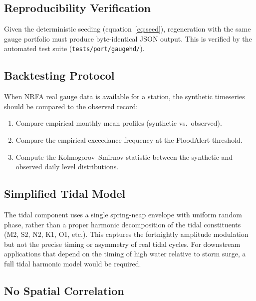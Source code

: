\documentclass[11pt,a4paper]{article}
\begin{document}
\subsection{Reproducibility Verification}

Given the deterministic seeding (equation~\ref{eq:seed}), regeneration with the same
gauge portfolio must produce byte-identical JSON output. This is verified by the
automated test suite (\texttt{tests/port/gaugehd/}).

\subsection{Backtesting Protocol}

When NRFA real gauge data is available for a station, the synthetic timeseries should be
compared to the observed record:
\begin{enumerate}[nosep]
    \item Compare empirical monthly mean profiles (synthetic vs.\ observed).
    \item Compare the empirical exceedance frequency at the FloodAlert threshold.
    \item Compute the Kolmogorov--Smirnov statistic between the synthetic and observed
          daily level distributions.
\end{enumerate}

\mkmlimitations

\subsection{Simplified Tidal Model}

The tidal component uses a single spring-neap envelope with uniform random phase, rather
than a proper harmonic decomposition of the tidal constituents (M2, S2, N2, K1, O1, etc.).
This captures the fortnightly amplitude modulation but not the precise timing or asymmetry
of real tidal cycles. For downstream applications that depend on the timing of high water
relative to storm surge, a full tidal harmonic model would be required.

\subsection{No Spatial Correlation}
\end{document}
